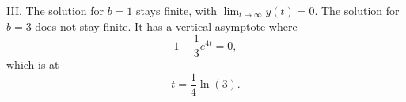 \documentclass[noauthor,handout]{ximera}
\begin{document}
\begin{problem}
\begin{freeResponse}
III. The solution for $b=1$ stays finite, with $\lim_{t\rightarrow \infty} y(t) = 0$. The solution for $b=3$ does not stay finite. It has a vertical asymptote where
$$
1-\frac{1}{3} e^{4t} = 0,
$$
which is at 
$$
t= \frac{1}{4} \ln (3).
$$
\end{freeResponse}
\end{problem}
\end{document}
